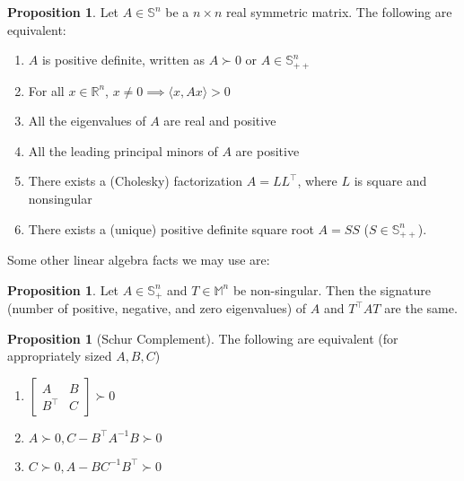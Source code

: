 \documentclass{article}
\numberwithin{equation}{section}
\theoremstyle{definition}
\newtheorem{proposition}[theorem]{Proposition}
\newcommand{\bM}{\mathbb{M}}
\newcommand{\bR}{\mathbb{R}}
\newcommand{\bS}{\mathbb{S}}
\begin{document}
\begin{proposition}
    Let $A\in\bS^n$ be a $n\times n$ real symmetric matrix. The following are equivalent:
    \begin{enumerate}[label=(\roman*)]
        \item $A$ is positive definite, written as $A\succ 0$ or $A\in\bS_{++}^n$
        \item For all $x\in\bR^n$, $x\neq 0\implies \langle x, Ax\rangle>0$
        \item All the eigenvalues of $A$ are real and positive
        \item All the leading principal minors of $A$ are positive
        \item There exists a (Cholesky) factorization $A=LL^\top$, where $L$ is square and nonsingular
        \item There exists a (unique) positive definite square root $A=SS$ ($S\in\bS_{++}^n$).
    \end{enumerate}
\end{proposition}
Some other linear algebra facts we may use are:
\begin{proposition}
    Let $A\in\bS_+^n$ and $T\in\bM^n$ be non-singular. Then the signature (number of positive, negative, and zero eigenvalues) of $A$ and $T^\top AT$ are the same.
\end{proposition}
\begin{proposition}[Schur Complement]
    The following are equivalent (for appropriately sized $A, B, C$)
    \begin{enumerate}[label=(\roman*)]
        \item $\begin{bmatrix}
        A&B\\B^\top& C
        \end{bmatrix}\succ 0$
        \item $A\succ 0, C-B^\top A^{-1}B\succ0$
        \item $C\succ 0, A-B C^{-1}B^\top\succ0$
    \end{enumerate}
\end{proposition}
\end{document}
